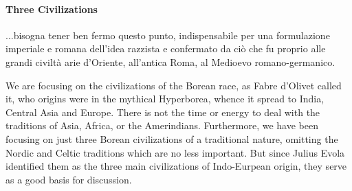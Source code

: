 \paragraph{Three Civilizations}
\begin{quotex}
...bisogna tener ben fermo questo punto, indispensabile per una formulazione imperiale e romana dell'idea razzista e confermato da ciò che fu proprio alle grandi civiltà arie d'Oriente, all'antica Roma, al Medioevo romano-germanico.

\end{quotex}
We are focusing on the civilizations of the Borean race, as Fabre d'Olivet called it, who origins were in the mythical Hyperborea, whence it spread to India, Central Asia and Europe. There is not the time or energy to deal with the traditions of Asia, Africa, or the Amerindians. Furthermore, we have been focusing on just three Borean civilizations of a traditional nature, omitting the Nordic and Celtic traditions which are no less important. But since Julius Evola identified them as the three main civilizations of Indo-Eurpean origin, they serve as a good basis for discussion.

